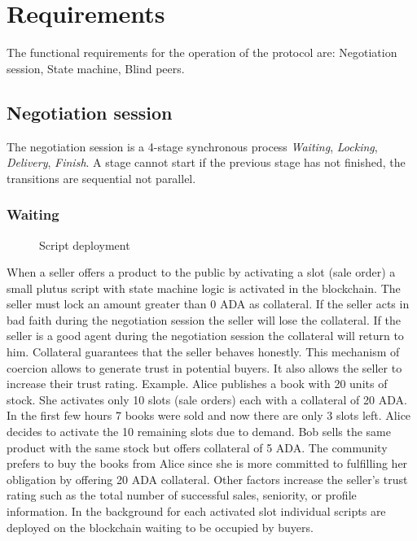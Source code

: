 \documentclass[12pt]{article}
\begin{document}
\section{ Requirements }

The functional requirements for the operation of the protocol are: Negotiation session, State machine, Blind peers.

\subsection { Negotiation session }

The negotiation session is a 4-stage synchronous process \emph{Waiting}, \emph{Locking}, \emph{Delivery}, \emph{Finish}. A stage cannot start if the previous stage has not finished, the transitions are sequential not parallel.

\subsubsection { Waiting }

\begin{figure}[ht]
  \centering
  
  \caption{Script deployment}
  \label{fig:mi_imagen}
\end{figure}


When a seller offers a product to the public by activating a slot (sale order) a small plutus script with state machine logic is activated in the blockchain.
The seller must lock an amount greater than 0 ADA as collateral. 
If the seller acts in bad faith during the negotiation session the seller will lose the collateral.
If the seller is a good agent during the negotiation session the collateral will return to him.
Collateral guarantees that the seller behaves honestly.
This mechanism of coercion allows to generate trust in potential buyers. 
It also allows the seller to increase their trust rating. Example. Alice publishes a book with 20 units of stock.
She activates only 10 slots (sale orders) each with a collateral of 20 ADA.
In the first few hours 7 books were sold and now there are only 3 slots left.
Alice decides to activate the 10 remaining slots due to demand.
Bob sells the same product with the same stock but offers collateral of 5 ADA. The community prefers to buy the books from Alice since she is more committed to fulfilling her obligation by offering 20 ADA collateral.
Other factors increase the seller's trust rating such as the total number of successful sales, seniority, or profile information.
In the background for each activated slot individual scripts are deployed on the blockchain waiting to be occupied by buyers.
\end{document}
